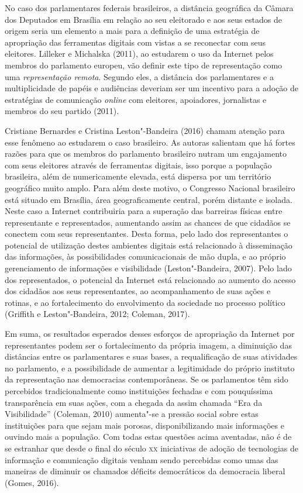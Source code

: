 No caso dos parlamentares federais brasileiros, a distância geográfica
da Câmara dos Deputados em Brasília em relação ao seu eleitorado e aos
seus estados de origem seria um elemento a mais para a definição de uma
estratégia de apropriação das ferramentas digitais com vistas a se
reconectar com seus eleitores. Lilleker e Michalska (2011), ao estudarem
o uso da Internet pelos membros do parlamento europeu, vão definir este
tipo de representação como uma \emph{representação remota}. Segundo
eles, a distância dos parlamentares e a multiplicidade de papéis e
audiências deveriam ser um incentivo para a adoção de estratégias de
comunicação \emph{online} com eleitores, apoiadores, jornalistas e membros do
seu partido (2011).

Cristiane Bernardes e Cristina Leston"-Bandeira (2016) chamam atenção
para esse fenômeno ao estudarem o caso brasileiro. As autoras salientam
que há fortes razões para que os membros do parlamento brasileiro nutram
um engajamento com seus eleitores através de ferramentas digitais, isso
porque a população brasileira, além de numericamente elevada, está
dispersa por um território geográfico muito amplo. Para além deste
motivo, o Congresso Nacional brasileiro está situado em Brasília, área
geograficamente central, porém distante e isolada. Neste caso a Internet
contribuiria para a superação das barreiras físicas entre representante
e representados, aumentando assim as chances de que cidadãos se conectem
com seus representantes. Desta forma, pelo lado dos representantes o
potencial de utilização destes ambientes digitais está relacionado à
disseminação das informações, às possibilidades comunicacionais de mão
dupla, e ao próprio gerenciamento de informações e visibilidade
(Leston"-Bandeira, 2007). Pelo lado dos representados, o potencial da
Internet está relacionado ao aumento do acesso dos cidadãos aos seus
representantes, ao acompanhamento de suas ações e rotinas, e ao
fortalecimento do envolvimento da sociedade no processo político
(Griffith e Leston"-Bandeira, 2012; Coleman, 2017).

Em suma, os resultados esperados desses esforços de apropriação da
Internet por representantes podem ser o fortalecimento da própria
imagem, a diminuição das distâncias entre os parlamentares e suas bases,
a requalificação de suas atividades no parlamento, e a possibilidade de
aumentar a legitimidade do próprio instituto da representação nas
democracias contemporâneas. Se os parlamentos têm sido percebidos
tradicionalmente como instituições fechadas e com pouquíssima
transparência em suas ações, com a chegada da assim chamada ``Era da
Visibilidade'' (Coleman, 2010) aumenta"-se a pressão social sobre estas
instituições para que sejam mais porosas, disponibilizando mais
informações e ouvindo mais a população. Com todas estas questões acima
aventadas, não é de se estranhar que desde o final do século \textsc{xx}
iniciativas de adoção de tecnologias de informação e comunicação
digitais venham sendo percebidas como umas das maneiras de diminuir os
chamados déficits democráticos da democracia liberal (Gomes, 2016).

